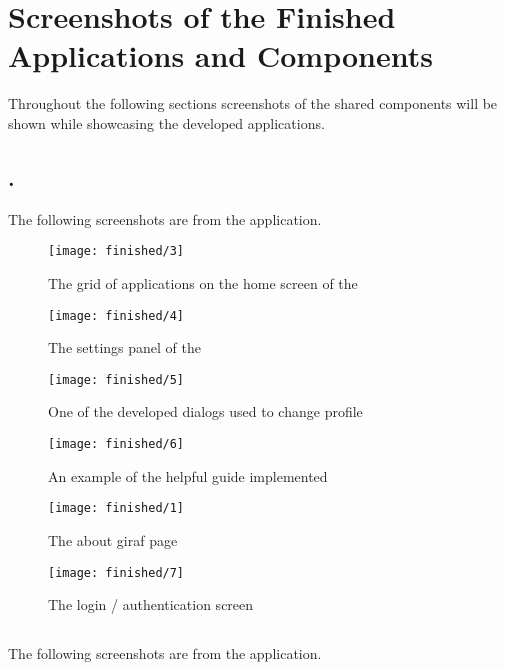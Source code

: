 
\chapter{Screenshots of the Finished Applications and Components}
Throughout the following sections screenshots of the shared components will be shown while showcasing the developed applications.

\section{\launcher.}
The following screenshots are from the \launcher application.

\begin{figure}[!htbp]
	\centering
	\texttt{[image: finished/3]}
	\caption{The grid of applications on the home screen of the \launcher}
\end{figure}
\FloatBarrier

\begin{figure}[!htbp]
	\centering
	\texttt{[image: finished/4]}
	\caption{The settings panel of the \launcher}
\end{figure}
\FloatBarrier

\begin{figure}[!htbp]
	\centering
	\texttt{[image: finished/5]}
	\caption{One of the developed dialogs used to change profile}
\end{figure}
\FloatBarrier

\begin{figure}[!htbp]
	\centering
	\texttt{[image: finished/6]}
	\caption{An example of the helpful guide implemented}
\end{figure}
\FloatBarrier

\begin{figure}[!htbp]
	\centering
	\texttt{[image: finished/1]}
	\caption{The about giraf page}
\end{figure}
\FloatBarrier

\begin{figure}[!htbp]
	\centering
	\texttt{[image: finished/7]}
	\caption{The login / authentication screen}
\end{figure}
\FloatBarrier

\section{\ct}
The following screenshots are from the \ct application.

